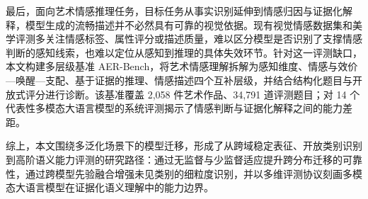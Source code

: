 \begin{cabstract}
最后，面向艺术情感推理任务，目标任务从事实识别延伸到情感归因与证据化解释，模型生成的流畅描述并不必然具有可靠的视觉依据。现有视觉情感数据集和美学评测多关注情感标签、属性评分或描述质量，难以区分模型是否识别了支撑情感判断的感知线索，也难以定位从感知到推理的具体失效环节。针对这一评测缺口，本文构建多层级基准 AER-Bench，将艺术情感理解拆解为感知维度、情感与效价—唤醒—支配、基于证据的推理、情感描述四个互补层级，并结合结构化题目与开放式评分进行诊断。该基准覆盖 2{,}058 件艺术作品、34{,}791 道评测题目；对 14 个代表性多模态大语言模型的系统评测揭示了情感判断与证据化解释之间的能力差距。

综上，本文围绕多泛化场景下的模型迁移，形成了从跨域稳定表征、开放类别识别到高阶语义能力评测的研究路径：通过无监督与少监督适应提升跨分布迁移的可靠性，通过跨模型先验融合增强未见类别的细粒度识别，并以多维评测协议刻画多模态大语言模型在证据化语义理解中的能力边界。

\end{cabstract}
